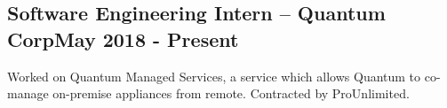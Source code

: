 \documentclass[../Resume.tex]{subfiles}
\begin{document}
    \subsection{Software Engineering Intern -- Quantum Corp\null\hfill May 2018 - Present}
    \par Worked on Quantum Managed Services, a service which allows Quantum to co-manage on-premise appliances from remote.
    Contracted by ProUnlimited.
    \vspace*{-2mm}
\end{document}

